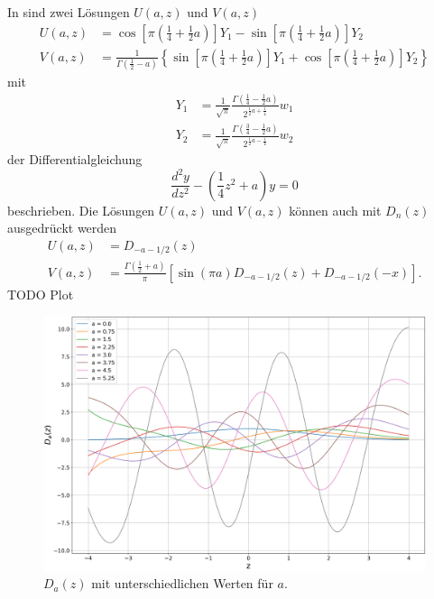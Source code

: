 In \cite{parzyl:abramowitz-stegun} sind zwei Lösungen $U(a, z)$ und $V(a,z)$ 
\begin{align}
    U(a,z) &= 
    \cos\left[\pi \left({\textstyle \frac{1}{4}} + {\textstyle \frac{1}{2}} a\right)\right] Y_1
    - \sin\left[\pi \left({\textstyle \frac{1}{4}} + {\textstyle \frac{1}{2}} a\right)\right] Y_2 \\
    V(a,z) &= \frac{1}{\Gamma \left({\textstyle \frac{1}{2} - a}\right)} \left\{
    \sin\left[\pi \left({\textstyle \frac{1}{4}} + {\textstyle \frac{1}{2}} a\right)\right] Y_1
    + \cos\left[\pi \left({\textstyle \frac{1}{4}} + {\textstyle \frac{1}{2}} a\right)\right] Y_2
    \right\}
\end{align}
mit
\begin{align}
    Y_1 &= \frac{1}{\sqrt{\pi}} 
            \frac{\Gamma\left({\textstyle \frac{1}{4} - 
            {\textstyle \frac{1}{2}}a}\right)}
            {2^{\frac{1}{2} a + \frac{1}{4}}} w_1\\
    Y_2 &= \frac{1}{\sqrt{\pi}} 
            \frac{\Gamma\left({\textstyle \frac{3}{4} - 
            {\textstyle \frac{1}{2}}a}\right)}
            {2^{\frac{1}{2} a - \frac{1}{4}}} w_2
\end{align}
der Differentialgleichung
\begin{equation}
    \frac{d^2 y}{d z^2} - \left(\frac{1}{4} z^2 + a\right) y = 0
\end{equation}
beschrieben. Die Lösungen $U(a,z)$ und $V(a, z)$ können auch mit $D_n(z)$
ausgedrückt werden
\begin{align}
    U(a,z) &= D_{-a-1/2}(z) \\
    V(a,z) &= \frac{\Gamma \left({\textstyle \frac{1}{2}} + a\right)}{\pi}
    \left[\sin\left(\pi a\right) D_{-a-1/2}(z) + D_{-a-1/2}(-x)\right].
\end{align}
TODO Plot
\begin{figure}
    \centering
    \includegraphics[scale=0.3]{papers/parzyl/img/D_plot.png}
    \caption{$D_a(z)$ mit unterschiedlichen Werten für $a$.}
    \label{parzyl:fig:dnz}
\end{figure}
